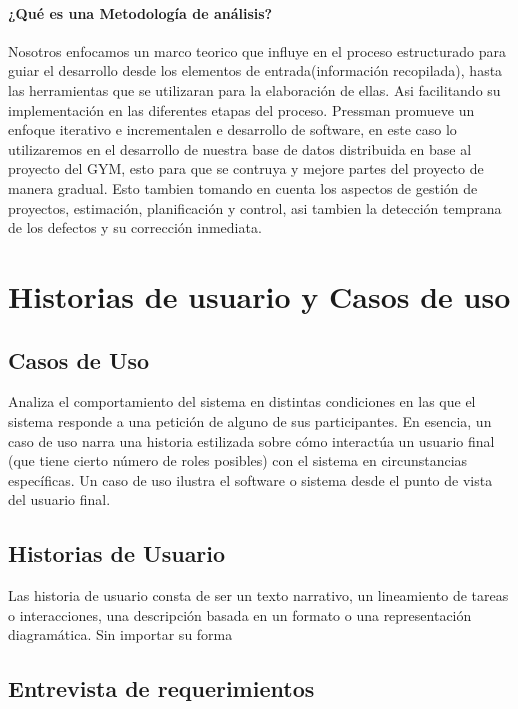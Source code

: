 \documentclass[spanish,12pt]{article}
\begin{document}
\paragraph{¿Qué es una Metodología de
análisis?}\label{quuxe9-es-una-metodologuxeda-de-anuxe1lisis}

Nosotros enfocamos un marco teorico que influye en el proceso
estructurado para guiar el desarrollo desde los elementos de
entrada(información recopilada), hasta las herramientas que se
utilizaran para la elaboración de ellas. Asi facilitando su
implementación en las diferentes etapas del proceso. Pressman promueve
un enfoque iterativo e incrementalen e desarrollo de software, en este
caso lo utilizaremos en el desarrollo de nuestra base de datos
distribuida en base al proyecto del GYM, esto para que se contruya y
mejore partes del proyecto de manera gradual. Esto tambien tomando en
cuenta los aspectos de gestión de proyectos, estimación, planificación y
control, asi tambien la detección temprana de los defectos y su
corrección inmediata.

\section{Historias de usuario y Casos de
uso}\label{historias-de-usuario-y-casos-de-uso}

\subsection{Casos de Uso}\label{casos-de-uso}

Analiza el comportamiento del sistema en distintas condiciones en las
que el sistema responde a una petición de alguno de sus participantes.
En esencia, un caso de uso narra una historia estilizada sobre cómo
interactúa un usuario final (que tiene cierto número de roles posibles)
con el sistema en circunstancias específicas. Un caso de uso ilustra el
software o sistema desde el punto de vista del usuario final.

\subsection{Historias de Usuario}\label{historias-de-usuario}

Las historia de usuario consta de ser un texto narrativo, un lineamiento
de tareas o interacciones, una descripción basada en un formato o una
representación diagramática. Sin importar su forma

\subsection{Entrevista de
requerimientos}\label{entrevista-de-requerimientos}
\end{document}
